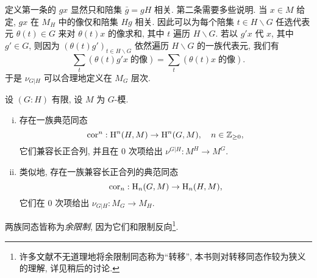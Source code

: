 定义第一条的 $gx$ 显然只和陪集 $\bar{g} = gH$ 相关. 第二条需要多些说明. 当 $x \in M$ 给定, $gx$ 在 $M_H$ 中的像仅和陪集 $Hg$ 相关. 因此可以为每个陪集 $t \in H \backslash G$ 任选代表元 $\theta(t) \in G$ 来对 $\theta(t) x$ 的像求和, 其中 $t$ 遍历 $H \backslash G$. 若以 $g' x$ 代 $x$, 其中 $g' \in G$, 则因为 $(\theta(t) g')_{t \in H \backslash G}$ 依然遍历 $H \backslash G$ 的一族代表元, 我们有
\[ \sum_t (\theta(t) g' x \;\text{的像}) = \sum_t (\theta(t) x \;\text{的像}). \]
于是 $\nu_{G|H}$ 可以合理地定义在 $M_G$ 层次.

\begin{definition-proposition}\label{def:cor}
	设 $(G:H)$ 有限, 设 $M$ 为 $G$-模.
	\begin{enumerate}[(i)]
		\item 存在一族典范同态
		\[ \mathrm{cor}^n: \operatorname{H}^n(H, M) \to \operatorname{H}^n(G, M), \quad n \in \mathbb{Z}_{\geq 0}, \]
		它们兼容长正合列, 并且在 $0$ 次项给出 $\nu^{G|H}: M^H \to M^G$.
		\item 类似地, 存在一族兼容长正合列的典范同态
		\[ \mathrm{cor}_n: \operatorname{H}_n(G, M) \to \operatorname{H}_n(H, M), \]
		它们在 $0$ 次项给出 $\nu_{G|H}: M_G \to M_H$.
	\end{enumerate}
	两族同态皆称为\emph{余限制}, 因为它们和限制反向\footnote{许多文献不无道理地将余限制同态称为``转移'', 本书则对转移同态作较为狭义的理解, 详见稍后的讨论.}.
\end{definition-proposition}
